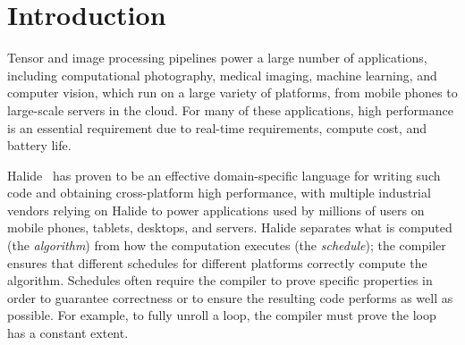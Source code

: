 \documentclass[sigplan,10pt,review,anonymous]{acmart}\settopmatter{printfolios=true,printccs=false,printacmref=false}
\begin{document}




\maketitle


\section{Introduction}
Tensor and image processing pipelines power a large number of applications,
including computational photography, medical imaging, machine learning,
and computer vision, which run on a large variety of platforms, from
mobile phones to large-scale servers in the cloud.  For many of these
applications, high performance is an essential requirement due to real-time
requirements, compute cost, and battery life.

Halide~\cite{ragankelley2012halide, ragankelley2013halide} has proven to be an effective
domain-specific language for writing such code and obtaining cross-platform
high performance, with multiple industrial vendors relying on Halide to power
applications used by millions of users on mobile phones, tablets, desktops, and
servers.  Halide separates what is computed (the \textit{algorithm}) from how
the computation executes (the \textit{schedule}); the compiler ensures that
different schedules for different platforms correctly compute the algorithm.
Schedules often require the compiler to prove specific properties in order
to guarantee correctness or to ensure the resulting code performs as well
as possible.  For example, to fully unroll a loop, the compiler must prove
the loop has a constant extent.
\end{document}
